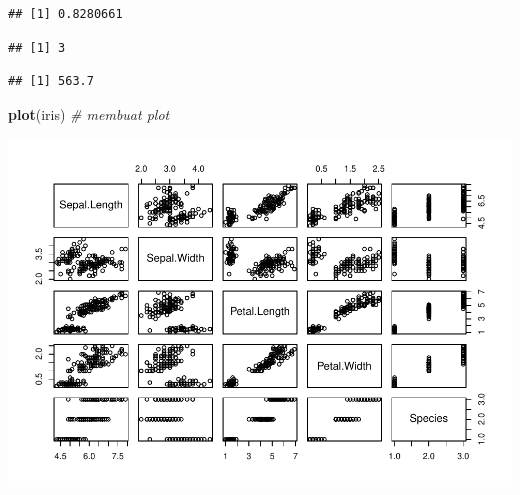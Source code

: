 \documentclass[]{article}
\newenvironment{Shaded}{\begin{snugshade}}{\end{snugshade}}
\newcommand{\KeywordTok}[1]{\textcolor[rgb]{0.13,0.29,0.53}{\textbf{#1}}}
\newcommand{\CommentTok}[1]{\textcolor[rgb]{0.56,0.35,0.01}{\textit{#1}}}
\newcommand{\OperatorTok}[1]{\textcolor[rgb]{0.81,0.36,0.00}{\textbf{#1}}}
\newcommand{\NormalTok}[1]{#1}
\begin{document}
\begin{Shaded}
\end{Shaded}

\begin{verbatim}
## [1] 0.8280661
\end{verbatim}

\begin{Shaded}
\end{Shaded}

\begin{verbatim}
## [1] 3
\end{verbatim}

\begin{Shaded}
\end{Shaded}

\begin{verbatim}
## [1] 563.7
\end{verbatim}

\begin{Shaded}
\begin{Highlighting}[]
\KeywordTok{plot}\NormalTok{(iris) }\CommentTok{# membuat plot}
\end{Highlighting}
\end{Shaded}

\includegraphics{001_pendahuluan_files/figure-latex/unnamed-chunk-5-1.pdf}
\end{document}

